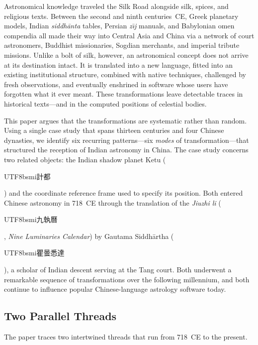 \documentclass[10pt,a4paper]{article}
\newcommand{\zh}[1]{\begin{CJK}{UTF8}{bsmi}#1\end{CJK}}
\begin{document}
Astronomical knowledge traveled the Silk Road alongside silk, spices, and
religious texts.  Between the second and ninth centuries~CE, Greek planetary
models, Indian \textit{siddh\=anta} tables, Persian \textit{z\={\i}j} manuals,
and Babylonian omen compendia all made their way into Central Asia and China via
a network of court astronomers, Buddhist missionaries, Sogdian merchants, and
imperial tribute missions.  Unlike a bolt of silk, however, an astronomical concept
does not arrive at its destination intact.  It is translated into a new language,
fitted into an existing institutional structure, combined with native techniques,
challenged by fresh observations, and eventually enshrined in software whose users
have forgotten what it ever meant.  These transformations leave detectable traces
in historical texts---and in the computed positions of celestial bodies.

This paper argues that the transformations are systematic rather than random.
Using a single case study that spans thirteen centuries and four Chinese dynasties,
we identify six recurring patterns---six \emph{modes} of transformation---that
structured the reception of Indian astronomy in China.  The case study concerns
two related objects: the Indian shadow planet Ketu (\zh{計都}) and the coordinate
reference frame used to specify its position.  Both entered Chinese astronomy in
718~CE through the translation of the \textit{Jiuzhi li} (\zh{九執曆},
\textit{Nine Luminaries Calendar}) by Gautama Siddh\=artha (\zh{瞿曇悉達}), a
scholar of Indian descent serving at the Tang court.  Both underwent a remarkable
sequence of transformations over the following millennium, and both continue to
influence popular Chinese-language astrology software today.

\subsection*{Two Parallel Threads}

The paper traces two intertwined threads that run from 718~CE to the present.
\end{document}

